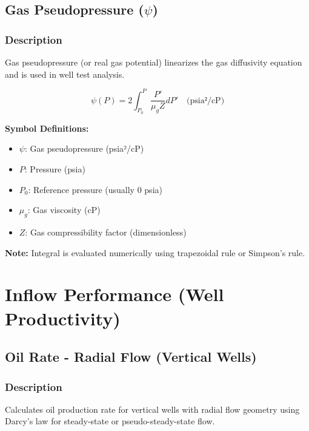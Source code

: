 \documentclass[11pt,a4paper]{article}
\newcommand{\symitem}[2]{\item \textbf{#1}: #2}
\begin{document}
\subsection{Gas Pseudopressure ($\psi$)}

\subsubsection{Description}
Gas pseudopressure (or real gas potential) linearizes the gas diffusivity equation and is used in well test analysis.

\begin{tcolorbox}[colback=formulabox,colframe=black!75]
\begin{equation}
\psi(P) = 2 \int_{P_0}^{P} \frac{P'}{\mu_g Z} dP' \quad \text{(psia²/cP)}
\end{equation}
\end{tcolorbox}

\textbf{Symbol Definitions:}
\begin{itemize}[leftmargin=2cm]
\symitem{$\psi$}{Gas pseudopressure (psia²/cP)}
\symitem{$P$}{Pressure (psia)}
\symitem{$P_0$}{Reference pressure (usually 0 psia)}
\symitem{$\mu_g$}{Gas viscosity (cP)}
\symitem{$Z$}{Gas compressibility factor (dimensionless)}
\end{itemize}

\textbf{Note:} Integral is evaluated numerically using trapezoidal rule or Simpson's rule.

\newpage

\section{Inflow Performance (Well Productivity)}

\subsection{Oil Rate - Radial Flow (Vertical Wells)}

\subsubsection{Description}
Calculates oil production rate for vertical wells with radial flow geometry using Darcy's law for steady-state or pseudo-steady-state flow.
\end{document}

